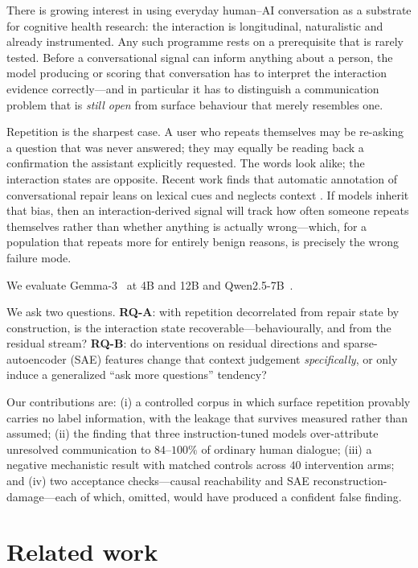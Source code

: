 \documentclass[conference]{IEEEtran}
\begin{document}
There is growing interest in using everyday human--AI conversation as a substrate for cognitive
health research: the interaction is longitudinal, naturalistic and already instrumented. Any such
programme rests on a prerequisite that is rarely tested. Before a conversational signal can inform
anything about a person, the model producing or scoring that conversation has to interpret the
interaction evidence correctly---and in particular it has to distinguish a communication problem
that is \emph{still open} from surface behaviour that merely resembles one.

Repetition is the sharpest case. A user who repeats themselves may be re-asking a question that was
never answered; they may equally be reading back a confirmation the assistant explicitly requested.
The words look alike; the interaction states are opposite. Recent work finds that automatic
annotation of conversational repair leans on lexical cues and neglects context \cite{ngo2026}. If
models inherit that bias, then an interaction-derived signal will track how often someone repeats
themselves rather than whether anything is actually wrong---which, for a population that repeats
more for entirely benign reasons, is precisely the wrong failure mode.

We evaluate Gemma-3~\cite{gemma3} at 4B and 12B and Qwen2.5-7B~\cite{qwen25}.

We ask two questions. \textbf{RQ-A}: with repetition decorrelated from repair state by
construction, is the interaction state recoverable---behaviourally, and from the residual stream?
\textbf{RQ-B}: do interventions on residual directions and sparse-autoencoder (SAE) features change
that context judgement \emph{specifically}, or only induce a generalized ``ask more questions''
tendency?

Our contributions are: (i) a controlled corpus in which surface repetition provably carries no
label information, with the leakage that survives measured rather than assumed; (ii) the finding
that three instruction-tuned models over-attribute unresolved communication to $84$--$100\%$ of
ordinary human dialogue; (iii) a negative mechanistic result with matched controls across $40$
intervention arms; and (iv) two acceptance checks---causal reachability and SAE
reconstruction-damage---each of which, omitted, would have produced a confident false finding.

\section{Related work}
\label{sec:related}
\end{document}
